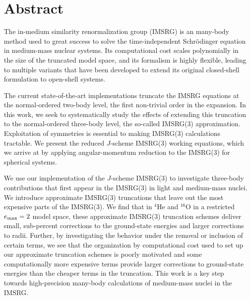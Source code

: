 \chapter*{Abstract}

The in-medium similarity renormalization group (IMSRG)
is an \abinitio{} many-body method used to great success
to solve the time-independent Schr\"{o}dinger equation in medium-mass nuclear systems.
Its computational cost scales polynomially in the size of the truncated model space,
and its formalism is highly flexible,
leading to multiple variants that have been developed to extend its original closed-shell
formulation to open-shell systems.

The current state-of-the-art implementations truncate the IMSRG equations
at the normal-ordered two-body level,
the first non-trivial order in the expansion.
In this work, we seek to systematically study the effects
of extending this truncation to the normal-ordered three-body level,
the so-called IMSRG(3) approximation.
Exploitation of symmetries is essential to making IMSRG(3) calculations tractable.
We present the reduced $J$-scheme IMSRG(3) working equations,
which we arrive at by applying angular-momentum reduction to the IMSRG(3) for spherical systems.

We use our implementation of the $J$-scheme IMSRG(3)
to investigate three-body contributions
that first appear in the IMSRG(3)
in light and medium-mass nuclei.
We introduce approximate IMSRG(3) truncations
that leave out the most expensive parts of the IMSRG(3).
We find that in ${}^{4}\text{He}$
and ${}^{16}\text{O}$
in a restricted $e_{\text{max}}=2$ model space,
these approximate IMSRG(3) truncation schemes
deliver small, sub-percent corrections to the ground-state energies
and larger corrections to radii.
Further, by investigating the behavior
under the removal or inclusion of certain terms,
we see that the organization by computational cost
used to set up our approximate truncation schemes
is poorly motivated
and some computationally more expensive terms
provide larger corrections to ground-state energies
than the cheaper terms in the truncation.
This work is a key step towards
high-precision many-body calculations of medium-mass nuclei
in the IMSRG.

